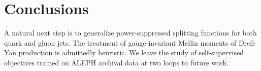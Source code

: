 \section{Conclusions}\label{sec:conclusions}

A natural next step is to generalize power-suppressed splitting
functions for both quark and gluon jets. The treatment of
gauge-invariant Mellin moments of Drell-Yan production is admittedly
heuristic. We leave the study of self-supervised objectives trained on
ALEPH archival data at two loops to future work.

